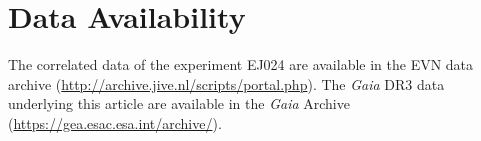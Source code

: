 \documentclass[fleqn,usenatbib]{mnras}
\begin{document}
\section*{Data Availability}

 
The correlated data of the experiment EJ024 are available in the EVN data archive (\url{http://archive.jive.nl/scripts/portal.php}).
The \textit{Gaia} DR3 data underlying this article are available in the \textit{Gaia} Archive (\url{https://gea.esac.esa.int/archive/}).












\appendix





\bsp	%
\label{lastpage}
\end{document}
